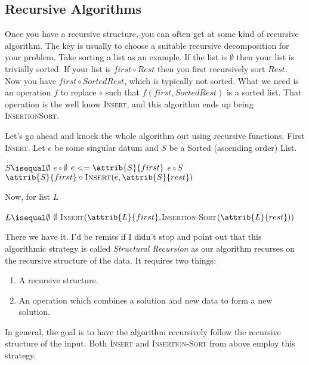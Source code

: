 \documentclass[]{tufte-handout}
\begin{document}
\subsection{Recursive Algorithms}

Once you have a recursive structure, you can often get at some kind of recursive algorithm. The key is usually to choose a suitable recursive decomposition for your problem. Take sorting a list as an example.  If the list is $\emptyset$ then your list is trivially sorted.  If your list is $first \circ Rest$ then you first recursively sort $Rest$.   Now you have $first \circ SortedRest$, which is typically not sorted. What we need is an operation $f$ to replace $\circ$  such that $f(first,SortedRest)$ is a sorted list. That operation is the well know \textsc{Insert}, and this algorithm ends up being \textsc{InsertionSort}.

Let's go ahead and knock the whole algorithm out using recursive functions. First \textsc{Insert}. Let $e$ be some singular datum and $S$ be a Sorted (ascending order) List.
\begin{codebox}
\li  \If $S \isequal \emptyset$
\li  \Then 
	   \Return $e \circ \emptyset$  
\li  \ElseIf $e <= \attrib{S}{first}$
\li  \Then 
        \Return $e \circ S$
\li  \ElseNoIf
\li   \Return $\attrib{S}{first} \circ \textsc{Insert}(e,\attrib{S}{rest})$
	 \End
\end{codebox}

Now, for list $L$
\begin{codebox}
\li \If $L \isequal \emptyset$
\li \Then
		\Return $\emptyset$
\li \Else
\li     \Return \textsc{Insert}$(\attrib{L}{first},$\textsc{Insertion-Sort}$(\attrib{L}{rest}))$
    \End
\end{codebox}

There we have it. I'd be remiss if I didn't stop and point out that this algorithmic strategy is called \textit{Structural Recursion} as our algorithm recurses on the recursive structure of the data. It requires two things:
\begin{enumerate}
\item A recursive structure.
\item An operation which combines a solution and new data to form a new solution.
\end{enumerate}
In general, the goal is to have the algorithm recursively follow the recursive structure of the input. Both \textsc{Insert} and \textsc{Insertion-Sort} from above employ this strategy.
\end{document}
